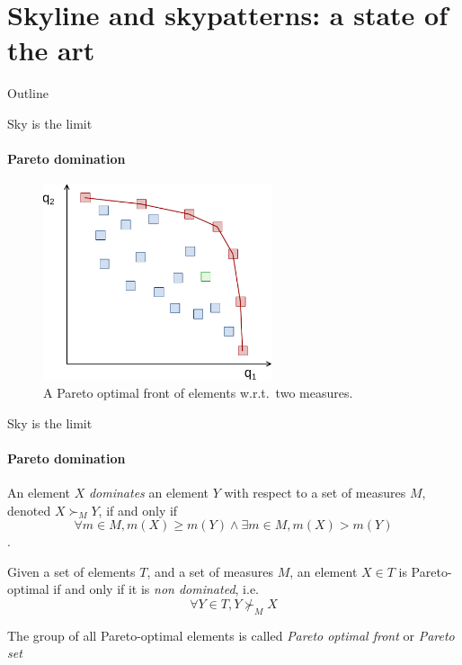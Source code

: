 \documentclass{beamer}
\begin{document}
\section{Skyline and skypatterns: a state of the art}
\begin{frame}{Outline}
  \tableofcontents[currentsection]
\end{frame}

\begin{frame}{Sky is the limit}
  \framesubtitle{Pareto domination}
  \begin{figure}[htp]
    \centering
    \includegraphics[width=0.6\textwidth]{domination.pdf}
    \caption{A Pareto optimal front of elements w.r.t.\ two measures.}
  \end{figure}  
\end{frame}

\begin{frame}{Sky is the limit}
  \framesubtitle{Pareto domination}
  \begin{definition}
  \label{def:pareto}
  An element $X$ \emph{dominates} an element
  $Y$ with respect to a set of measures
  $M$, denoted $X \succ_M Y$, if and only if $$\forall m \in M, m(X)
  \geq m(Y) \wedge \exists m \in M, m(X) > m(Y)$$.
 \end{definition}
 \pause
 \begin{definition}
  Given a set of elements $T$, and a set of
  measures $M$, an element $X \in T$ is Pareto-optimal if and only if it is \emph{non dominated}, i.e.\
    $$\forall Y \in T, Y \nsucc_M X $$
  \end{definition}

The group of all Pareto-optimal elements is called \emph{Pareto optimal front} or \emph{Pareto set}

\end{frame}
\end{document}

